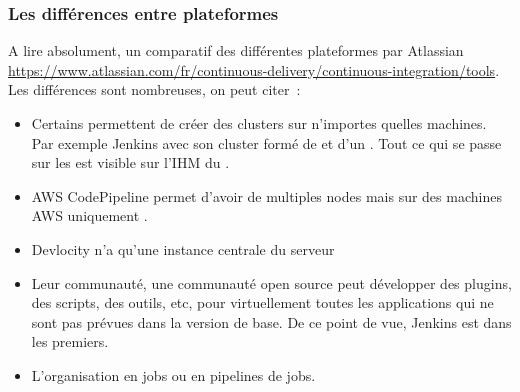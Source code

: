 \documentclass{beamer}
\begin{document}
    \begin{frame}
        \frametitle{Les différences entre plateformes}
        \transdissolve
        A lire absolument, un comparatif des différentes plateformes par Atlassian \url{https://www.atlassian.com/fr/continuous-delivery/continuous-integration/tools}.
        \bigbreak
        Les différences sont nombreuses, on peut citer~:
        \begin{itemize}
            \item Certains permettent de créer des clusters sur n'importes quelles machines.
            Par exemple Jenkins avec son cluster formé de  et d'un .
            Tout ce qui se passe sur les  est visible sur l'IHM du .
            \item AWS CodePipeline permet d'avoir de multiples nodes mais sur des machines AWS uniquement .
            \item Devlocity n'a qu'une instance centrale du serveur
            \item Leur communauté, une communauté open source peut développer des plugins, des scripts, des outils, etc, pour virtuellement toutes les applications qui ne sont pas prévues dans la version de base.
            De ce point de vue, Jenkins est dans les premiers.
            \item L'organisation en jobs ou en pipelines de jobs.
        \end{itemize}
    \end{frame}
\end{document}
